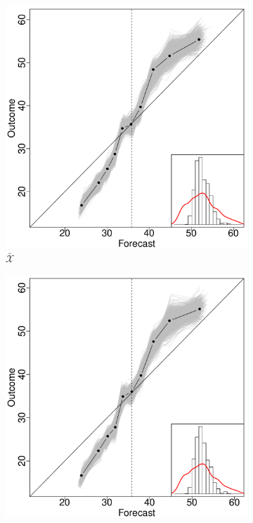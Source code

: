 \documentclass[11pt]{article}
\theoremstyle{definition}
\theoremstyle{definition}
\begin{document}
\begin{figure}
        \centering
 
        \begin{subfigure}[b]{0.323\textwidth}
                \includegraphics[width=\textwidth]{IndependentELP}
                \caption{$\bar{\mathcal{X}}$}
                \label{fig:mouse}
        \end{subfigure}
                  \begin{subfigure}[b]{0.323\textwidth}
                \includegraphics[width=\textwidth]{IndependentOLP}

\end{subfigure}
\end{figure}
\end{document}
